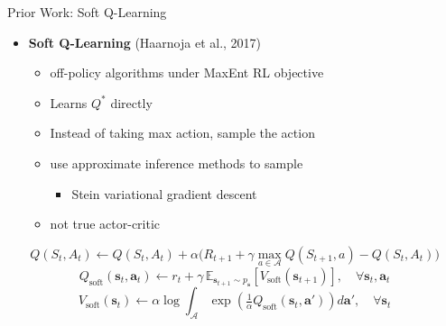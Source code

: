 \begin{frame}{Prior Work: Soft Q-Learning}
\begin{itemize}
    \item \textbf{Soft Q-Learning} (Haarnoja et al., 2017)
    \begin{itemize}
        \item off-policy algorithms under MaxEnt RL objective
        \item Learns $Q^{*}$ directly
        \item Instead of taking max action, sample the action
        \item use approximate inference methods to sample
        \begin{itemize}
            \item Stein variational gradient descent
        \end{itemize}
        \item not true actor-critic
    \end{itemize}
\end{itemize}
\[
Q(S_t, A_t) \leftarrow Q(S_t, A_t) + \alpha\big( R_{t+1} + \gamma \max_{a \in \mathcal{A}} Q(S_{t+1}, a) - Q(S_t, A_t) \big)
\]
\[
Q_{\text{soft}}(\mathbf{s}_t, \mathbf{a}_t) \leftarrow r_t + \gamma\, \mathbb{E}_{\mathbf{s}_{t+1} \sim p_{\mathbf{s}}}\!\left[ V_{\text{soft}}(\mathbf{s}_{t+1}) \right], \quad \forall \mathbf{s}_t, \mathbf{a}_t
\]
\[
V_{\text{soft}}(\mathbf{s}_t) \leftarrow \alpha \log \int_{\mathcal{A}} \exp\!\left( \tfrac{1}{\alpha} Q_{\text{soft}}(\mathbf{s}_t, \mathbf{a}') \right) d\mathbf{a}',\quad \forall \mathbf{s}_t
\]
\end{frame}
